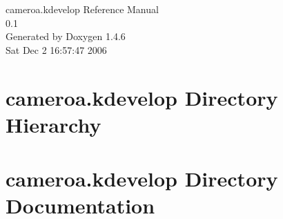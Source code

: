 \documentclass[a4paper]{book}
\begin{document}
\begin{titlepage}
\vspace*{7cm}
\begin{center}
{\Large cameroa.kdevelop Reference Manual\\[1ex]\large 0.1 }\\
\vspace*{1cm}
{\large Generated by Doxygen 1.4.6}\\
\vspace*{0.5cm}
{\small Sat Dec 2 16:57:47 2006}\\
\end{center}
\end{titlepage}
\clearemptydoublepage
{}
\tableofcontents
\clearemptydoublepage
{}
\chapter{cameroa.kdevelop Directory Hierarchy}

\chapter{cameroa.kdevelop Directory Documentation}






\printindex
\end{document}
